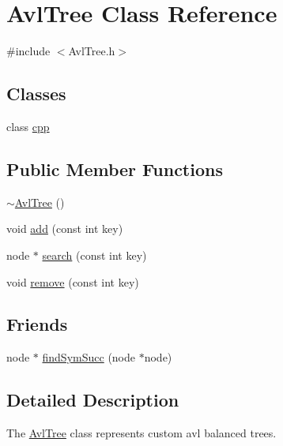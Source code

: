 \hypertarget{classAvlTree}{\section{Avl\-Tree Class Reference}
\label{classAvlTree}
}


{\ttfamily \#include $<$Avl\-Tree.\-h$>$}

\subsection*{Classes}
\begin{DoxyCompactItemize}
\item 
class \hyperlink{classAvlTree_1_1cpp}{cpp}
\end{DoxyCompactItemize}
\subsection*{Public Member Functions}
\begin{DoxyCompactItemize}
\item 
\hyperlink{classAvlTree_ada89cb30925d36a56e3aab8768752468}{$\sim$\-Avl\-Tree} ()
\item 
void \hyperlink{classAvlTree_a8ef63ed11092c12589dca726ee20132b}{add} (const int key)
\item 
node $\ast$ \hyperlink{classAvlTree_ab2ca84658574e6a199273eb835c93bf8}{search} (const int key)
\item 
void \hyperlink{classAvlTree_a20c8f808bd2b6a6f8b459fa24f09a15c}{remove} (const int key)
\end{DoxyCompactItemize}
\subsection*{Friends}
\begin{DoxyCompactItemize}
\item 
node $\ast$ \hyperlink{classAvlTree_aa44539c647f5a99a52391ce61d96d759}{find\-Sym\-Succ} (node $\ast$node)
\end{DoxyCompactItemize}


\subsection{Detailed Description}
The \hyperlink{classAvlTree}{Avl\-Tree} class represents custom avl balanced trees. 

